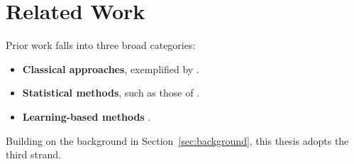 \section{Related Work}
\label{sec:related-work}

Prior work falls into three broad categories:
\begin{itemize}
    \item \textbf{Classical approaches}, exemplified by \citet{bridson2015}.
    \item \textbf{Statistical methods}, such as those of \citet{smith2020}.
    \item \textbf{Learning-based methods} \citep{lee2019}.
\end{itemize}

Building on the background in Section~\ref{sec:background}, this thesis adopts
the third strand. \lipsum[6]
